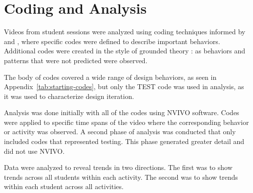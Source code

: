 \section{Coding and Analysis} \label{sec:analysis-plan}
Videos from student sessions were analyzed using coding techniques informed by \citet{welch} and \citet{REESE}, where specific codes were defined to describe important behaviors. Additional codes were created in the style of grounded theory \citep{strauss97}: as behaviors and patterns that were not predicted were observed. 

The body of codes covered a wide range of design behaviors, as seen in Appendix~\ref{tab:starting-codes}, but only the TEST code was used in analysis, as it was used to characterize design iteration. 

Analysis was done initially with all of the codes using NVIVO software. Codes were applied to specific time spans of the video where the corresponding behavior or activity was observed. A second phase of analysis was conducted that only included codes that represented testing. This phase generated greater detail and did not use NVIVO.

Data were analyzed to reveal trends in two directions. The first was to show trends across all students within each activity. The second was to show trends within each student across all activities.